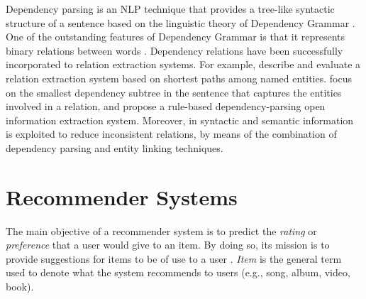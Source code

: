 Dependency parsing is an NLP technique that provides a tree-like syntactic structure of a sentence based on the linguistic theory of Dependency Grammar \citep{Tesniere1959}. One of the outstanding features of Dependency Grammar is that it represents binary relations between words \citep{BallesterosNivre2013}. %
Dependency relations have been successfully incorporated to relation extraction systems. For example, \cite{BunescuandMooney2005} describe and evaluate a relation extraction system based on shortest paths among named entities. \cite{CulottaSorensen2004} focus on the smallest dependency subtree in the sentence that captures the entities involved in a relation, and \cite{Gamallo2012} propose a rule-based dependency-parsing open information extraction system. Moreover, in \cite{Nakasholeetal2012,MoroandNavigli2012,DelliBovietal2015b} syntactic and semantic information is exploited to reduce inconsistent relations, by means of the combination of dependency parsing and entity linking techniques.


\section{Recommender Systems}
\label{sec:SOA:recommendation}

The main objective of a recommender system is to predict the \textit{rating} or \textit{preference} that a user would give to an item. By doing so, its mission is to provide suggestions for items to be of use to a user \citep{ricci2011introduction}. \textit{Item} is the general term used to denote what the system recommends to users (e.g., song, album, video, book).

